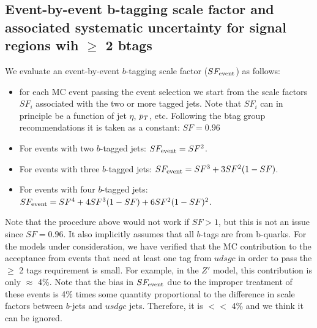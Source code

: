 \subsection{Event-by-event b-tagging scale factor and 
associated systematic uncertainty for signal regions wih $\geq$ 2 btags}
\label{sec:SF2btag}

We evaluate an event-by-event $b$-tagging scale factor ($SF_{\rm event}$) as follows:

\begin{itemize}
\item for each MC event passing the event selection we start
from the scale factors $SF_i$ associated with the two or more
tagged jets.  Note that $SF_i$ can in principle be a function 
of jet $\eta$, $p_T$, etc.  Following the btag group 
recommendations
it is taken as a constant: $SF=0.96$\cite{BTV11003, btvSyst}


\item For events with two $b$-tagged jets: $SF_{\rm event}=SF^2$.

\item For events with three $b$-tagged jets: $SF_{\rm event}=SF^3 + 3SF^2(1-SF)$.

\item For events with four $b$-tagged jets: $SF_{\rm event}=SF^4 + 4SF^3(1-SF) + 6SF^2(1-SF)^2$.
\end{itemize}

Note that the procedure above would not work if $SF>1$, but this is not an issue
since $SF=0.96$.
It also implicitly assumes that all $b$-tags are from b-quarks.  For the models under 
consideration, we have verified that the MC contribution to the acceptance from 
events that need at least one tag from $udsgc$ in order to pass the $\ge$ 2 tags 
requirement is small.  For example, in the $Z'$ model, this contribution is
only $\approx$ 4\%.  Note that the bias in $SF_{\rm event}$ due to the improper treatment
of these events is 4\% times some quantity proportional to the difference in scale 
factors between $b$-jets and $usdgc$ jets.  Therefore, it is $<<$ 4\% and we think it
can be ignored.  

